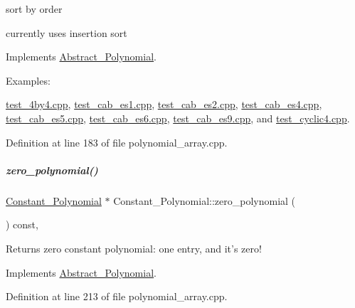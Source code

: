 sort by order 

currently uses insertion sort 

Implements \hyperlink{group__polygroup_a1fcdd29c324c660ea935197c39e682f2}{Abstract\+\_\+\+Polynomial}.

\begin{Desc}
\item[Examples\+: ]\par
\hyperlink{test_4by4_8cpp-example}{test\+\_\+4by4.\+cpp}, \hyperlink{test_cab_es1_8cpp-example}{test\+\_\+cab\+\_\+es1.\+cpp}, \hyperlink{test_cab_es2_8cpp-example}{test\+\_\+cab\+\_\+es2.\+cpp}, \hyperlink{test_cab_es4_8cpp-example}{test\+\_\+cab\+\_\+es4.\+cpp}, \hyperlink{test_cab_es5_8cpp-example}{test\+\_\+cab\+\_\+es5.\+cpp}, \hyperlink{test_cab_es6_8cpp-example}{test\+\_\+cab\+\_\+es6.\+cpp}, \hyperlink{test_cab_es9_8cpp-example}{test\+\_\+cab\+\_\+es9.\+cpp}, and \hyperlink{test_cyclic4_8cpp-example}{test\+\_\+cyclic4.\+cpp}.\end{Desc}


Definition at line 183 of file polynomial\+\_\+array.\+cpp.

\mbox{\label{group__polygroup_af7933d269e23525f1f357c0e00bc71ea}} 
\subparagraph{\texorpdfstring{zero\+\_\+polynomial()}{zero\_polynomial()}}
{\footnotesize\ttfamily \hyperlink{group__polygroup_class_constant___polynomial}{Constant\+\_\+\+Polynomial} $\ast$ Constant\+\_\+\+Polynomial\+::zero\+\_\+polynomial (\begin{DoxyParamCaption}{ }\end{DoxyParamCaption}) const\hspace{0.3cm}{\ttfamily [override]}, {\ttfamily [virtual]}}

\begin{DoxyReturn}{Returns}
zero constant polynomial\+: one entry, and it's zero! 
\end{DoxyReturn}


Implements \hyperlink{group__polygroup_ab50acaac5654329c0299d5694a25b1ed}{Abstract\+\_\+\+Polynomial}.



Definition at line 213 of file polynomial\+\_\+array.\+cpp.

\label{class_dense___univariate___integer___polynomial}

